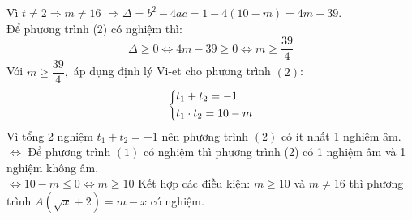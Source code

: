 \begin{bt}
{\begin{enumerate}
			Vì $t \ne 2 \Rightarrow m \ne 16$
			$ \Rightarrow \Delta  = {b^2} - 4ac = 1 - 4\left( 10 - m \right) = 4m - 39$.\\
			Để phương trình (2) có nghiệm thì:
			$$ \Delta  \ge 0 \Leftrightarrow 4m - 39 \ge 0 \Leftrightarrow m \ge \dfrac{39}{4}$$
			Với $m \ge \dfrac{39}{4},$ áp dụng định lý Vi-et cho phương trình $(2)$:
			$$\left\{\begin{aligned}& t_1 + t_2 =  - 1\\&t_1 \cdot t_2 = 10 - m\end{aligned}\right.$$
			Vì tổng 2 nghiệm $t_1 + t_2 =  - 1$ nên phương trình $(2)$ có ít nhất 1 nghiệm âm.\\
			$ \Leftrightarrow $ Để phương trình $(1)$ có nghiệm thì phương trình (2) có 1 nghiệm âm và 1 nghiệm không âm.\\
			$ \Leftrightarrow 10 - m \le 0 \Leftrightarrow m \ge 10$
			Kết hợp các điều kiện: $m \ge 10$ và $m \ne 16$ thì phương trình $ A\left( \sqrt x  + 2 \right) = m - x$ có nghiệm.
		\end{enumerate}
	}
\end{bt}
